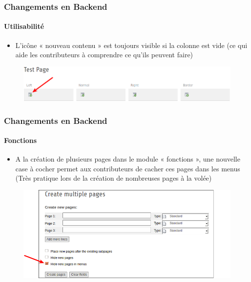 
\begin{frame}[fragile]
	\frametitle{Changements en Backend}
	\framesubtitle{Utilisabilité}

 	\begin{itemize}
		\item L'icône « nouveau contenu » est toujours visible si la colonne est vide\newline
			(ce qui aide les contributeurs à comprendre ce qu'ils peuvent faire)
	\end{itemize}

	\begin{figure}
		\includegraphics[width=0.95\linewidth]{Images/BackendChanges/NewContentIconAlwaysVisible.png}
	\end{figure}

\end{frame}


\begin{frame}[fragile]
	\frametitle{Changements en Backend}
	\framesubtitle{Fonctions}

	\begin{itemize}
		\item A la création de plusieurs pages dans le module « fonctions », une nouvelle case à cocher permet aux contributeurs de cacher ces pages dans les menus (Très pratique lors de la création de nombreuses pages à la volée)
	\end{itemize}

	\begin{figure}
		\includegraphics[width=0.85\linewidth]{Images/BackendChanges/CreateMultiplePagesHideInMenu.png}
	\end{figure}

\end{frame}

